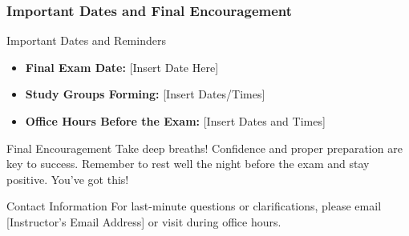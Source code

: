 \documentclass[aspectratio=169]{beamer}
\begin{document}
\begin{frame}[fragile]
    \frametitle{Important Dates and Final Encouragement}
    \begin{block}{Important Dates and Reminders}
        \begin{itemize}
            \item \textbf{Final Exam Date:} [Insert Date Here]
            \item \textbf{Study Groups Forming:} [Insert Dates/Times]
            \item \textbf{Office Hours Before the Exam:} [Insert Dates and Times]
        \end{itemize}
    \end{block}

    \begin{block}{Final Encouragement}
        Take deep breaths! Confidence and proper preparation are key to success. Remember to rest well the night before the exam and stay positive. You've got this!
    \end{block}

    \begin{block}{Contact Information}
        For last-minute questions or clarifications, please email [Instructor's Email Address] or visit during office hours.
    \end{block}
\end{frame}
\end{document}
